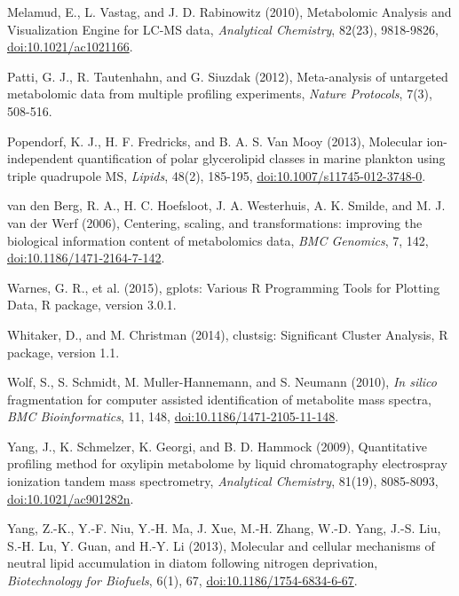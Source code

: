 \begin{singlespace}
{{Melamud, E., L. Vastag, and J. D. Rabinowitz (2010), Metabolomic Analysis and Visualization Engine for LC-MS data, \emph{Analytical Chemistry}, 82(23), 9818-9826, \href{http://dx.doi.org/10.1021/ac1021166}{doi:10.1021/ac1021166}.

Patti, G. J., R. Tautenhahn, and G. Siuzdak (2012), Meta-analysis of untargeted metabolomic data from multiple profiling experiments, \emph{Nature Protocols}, 7(3), 508-516.

Popendorf, K. J., H. F. Fredricks, and B. A. S. Van Mooy (2013), Molecular ion-independent quantification of polar glycerolipid classes in marine plankton using triple quadrupole MS, \emph{Lipids}, 48(2), 185-195, \href{http://dx.doi.org/10.1007/s11745-012-3748-0}{doi:10.1007/s11745-012-3748-0}.

van den Berg, R. A., H. C. Hoefsloot, J. A. Westerhuis, A. K. Smilde, and M. J. van der Werf (2006), Centering, scaling, and transformations: improving the biological information content of metabolomics data, \emph{BMC Genomics}, 7, 142, \href{http://dx.doi.org/10.1186/1471-2164-7-142}{doi:10.1186/1471-2164-7-142}.

Warnes, G. R., et al. (2015), gplots: Various R Programming Tools for Plotting Data, R package, version 3.0.1.

Whitaker, D., and M. Christman (2014), clustsig: Significant Cluster Analysis, R package, version 1.1.

Wolf, S., S. Schmidt, M. Muller-Hannemann, and S. Neumann (2010), \emph{In silico} fragmentation for computer assisted identification of metabolite mass spectra, \emph{BMC Bioinformatics}, 11, 148, \href{http://dx.doi.org/10.1186/1471-2105-11-148}{doi:10.1186/1471-2105-11-148}.

Yang, J., K. Schmelzer, K. Georgi, and B. D. Hammock (2009), Quantitative profiling method for oxylipin metabolome by liquid chromatography electrospray ionization tandem mass spectrometry, \emph{Analytical Chemistry}, 81(19), 8085-8093, \href{http://dx.doi.org/10.1021/ac901282n}{doi:10.1021/ac901282n}.

Yang, Z.-K., Y.-F. Niu, Y.-H. Ma, J. Xue, M.-H. Zhang, W.-D. Yang, J.-S. Liu, S.-H. Lu, Y. Guan, and H.-Y. Li (2013), Molecular and cellular mechanisms of neutral lipid accumulation in diatom following nitrogen deprivation, \emph{Biotechnology for Biofuels}, 6(1), 67, \href{http://dx.doi.org/10.1186/1754-6834-6-67}{doi:10.1186/1754-6834-6-67}.}}
\end{singlespace}